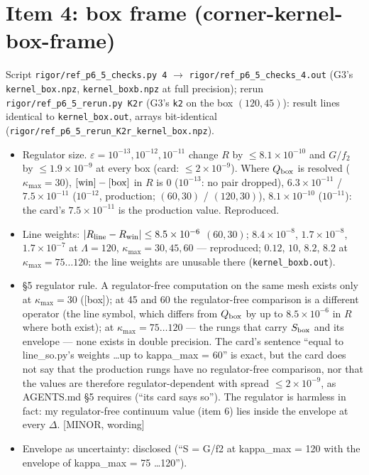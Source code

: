 \documentclass[11pt]{article}
\begin{document}
\section{Item 4: box frame (corner-kernel-box-frame)}
Script \texttt{rigor/ref\_p6\_5\_checks.py 4} $\to$ \texttt{rigor/ref\_p6\_5\_checks\_4.out} (G3's
\texttt{kernel\_box.npz}, \texttt{kernel\_boxb.npz} at full precision); rerun \texttt{rigor/ref\_p6\_5\_rerun.py K2r}
(G3's \texttt{k2} on the box $(120,45)$): result lines identical to \texttt{kernel\_box.out}, arrays bit-identical
(\texttt{rigor/ref\_p6\_5\_rerun\_K2r\_kernel\_box.npz}).
\begin{itemize}[leftmargin=*]
\item Regulator size. $\varepsilon=10^{-13},10^{-12},10^{-11}$ change $R$ by $\le8.1\times10^{-10}$ and $G/f_2$ by
$\le1.9\times10^{-9}$ at every box (card: $\le2\times10^{-9}$). Where $Q_{\rm box}$ is resolved ($\kappa_{\max}=30$),
$[{\rm win}]-[{\rm box}]$ in $R$ is $0$ ($10^{-13}$: no pair dropped), $6.3\times10^{-11}$ / $7.5\times10^{-11}$
($10^{-12}$, production; $(60,30)$ / $(120,30)$), $8.1\times10^{-10}$ ($10^{-11}$): the card's $7.5\times10^{-11}$ is the
production value. Reproduced.
\item Line weights: $|R_{\rm line}-R_{\rm win}|\le8.5\times10^{-6}$ $(60,30)$; $8.4\times10^{-8}$, $1.7\times10^{-8}$,
$1.7\times10^{-7}$ at $\Lambda=120$, $\kappa_{\max}=30,45,60$ --- reproduced; $0.12$, $10$, $8.2$, $8.2$ at
$\kappa_{\max}=75\ldots120$: the line weights are unusable there (\texttt{kernel\_boxb.out}).
\item \S5 regulator rule. A regulator-free computation on the same mesh exists only at $\kappa_{\max}=30$ ([box]); at
45 and 60 the regulator-free comparison is a different operator (the line symbol, which differs from $Q_{\rm box}$ by up
to $8.5\times10^{-6}$ in $R$ where both exist); at $\kappa_{\max}=75\ldots120$ --- the rungs that carry $S_{\rm box}$ and its
envelope --- none exists in double precision. The card's sentence ``equal to line\_so.py's weights \ldots up to
kappa\_max = 60'' is exact, but the card does not say that the production rungs have no regulator-free comparison,
nor that the values are therefore regulator-dependent with spread $\le2\times10^{-9}$, as AGENTS.md \S5 requires
(``its card says so''). The regulator is harmless in fact: my regulator-free continuum value (item 6) lies inside the
envelope at every $\Delta$. [MINOR, wording]
\item Envelope as uncertainty: disclosed (``S = G/f2 at kappa\_max = 120 with the envelope of kappa\_max = 75 \ldots 120'').

\end{itemize}
\end{document}
